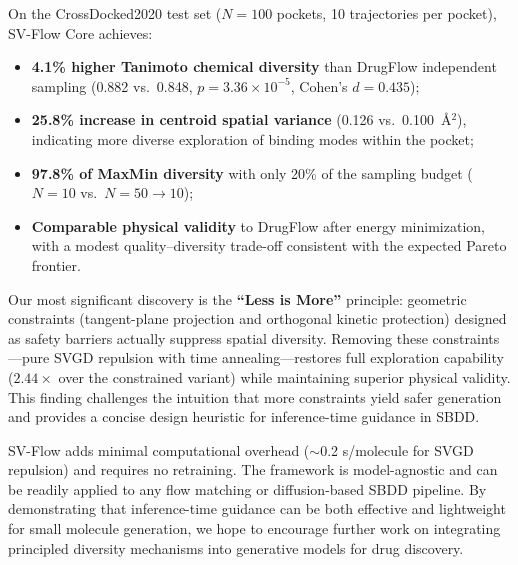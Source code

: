 \documentclass[a4paper,11pt]{article}
\begin{document}
On the CrossDocked2020 test set ($N = 100$ pockets, 10 trajectories per pocket),
SV-Flow Core achieves:

\begin{itemize}
  \item \textbf{4.1\% higher Tanimoto chemical diversity} than DrugFlow
    independent sampling (0.882 vs.\ 0.848, $p = 3.36 \times 10^{-5}$, Cohen's
    $d = 0.435$);
  \item \textbf{25.8\% increase in centroid spatial variance} (0.126 vs.\
    0.100~\AA$^2$), indicating more diverse exploration of binding modes within
    the pocket;
  \item \textbf{97.8\% of MaxMin diversity} with only 20\% of the sampling
    budget ($N = 10$ vs.\ $N = 50 \rightarrow 10$);
  \item \textbf{Comparable physical validity} to DrugFlow after energy
    minimization, with a modest quality--diversity trade-off consistent with the
    expected Pareto frontier.
\end{itemize}

Our most significant discovery is the \textbf{``Less is More''} principle:
geometric constraints (tangent-plane projection and orthogonal kinetic
protection) designed as safety barriers actually suppress spatial diversity.
Removing these constraints---pure SVGD repulsion with time annealing---restores
full exploration capability ($2.44\times$ over the constrained variant) while
maintaining superior physical validity.  This finding challenges the intuition
that more constraints yield safer generation and provides a concise design
heuristic for inference-time guidance in SBDD.

SV-Flow adds minimal computational overhead ($\sim$0.2 s/molecule for SVGD
repulsion) and requires no retraining.  The framework is model-agnostic and can
be readily applied to any flow matching or diffusion-based SBDD pipeline.  By
demonstrating that inference-time guidance can be both effective and lightweight
for small molecule generation, we hope to encourage further work on integrating
principled diversity mechanisms into generative models for drug discovery.
\end{document}
